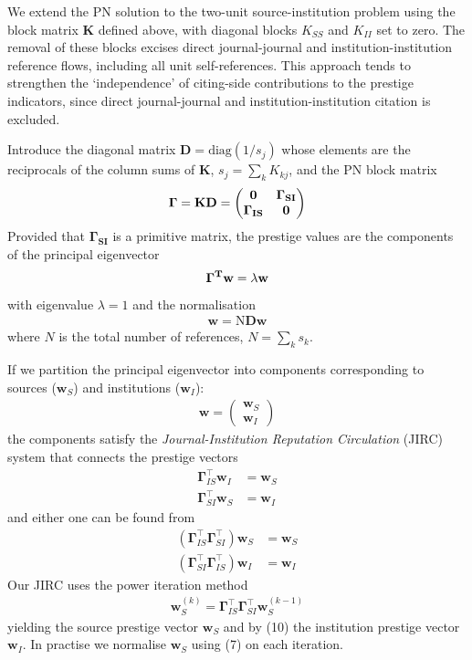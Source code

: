\documentclass[10pt]{article}
\begin{document}
We extend the PN solution to the two-unit source-institution problem using the block matrix $\mathbf{K}$ defined above, with diagonal blocks $K_{SS}$ and $K_{II}$ set to zero. The removal of these blocks excises direct journal-journal and institution-institution reference flows, including all unit self-references. This approach tends to strengthen the `independence' of citing-side contributions to the prestige indicators, since direct journal-journal and institution-institution citation is excluded. 

Introduce the diagonal matrix $\mathbf{D} = \text{diag}(1/s_j)$ whose elements are the reciprocals of the column sums of $\mathbf{K}$, $s_j = \sum_k K_{kj}$, and the PN block matrix 
\begin{align}
\bf{\Gamma} = \mathbf{K}\mathbf{D} = 
	\begin{pmatrix}
	\mathbf{0} & \bf{\Gamma}_{SI} \\
	\bf{\Gamma}_{IS} & \mathbf{0} 
\end{pmatrix}
\end{align}
Provided that $\mathbf{\Gamma_{SI}}$ is a primitive matrix, the prestige values are the components of the principal eigenvector
\begin{align}
\bf{\Gamma}^T \mathbf{w} = \lambda \mathbf{w}
\end{align}
with eigenvalue $\lambda = 1$ and the normalisation 
\begin{align}
\mathbf{w} = \text{N} \mathbf{D} \mathbf{w}  
\end{align}
where $N$ is the total number of references, $N = \sum_k s_k$.

If we partition the principal eigenvector into components corresponding to sources ($\mathbf{w}_S$) and institutions ($\mathbf{w}_I$):
\begin{align}
	\mathbf{w} = 
	\begin{pmatrix}
		\mathbf{w}_S \\
		\mathbf{w}_I
	\end{pmatrix}
\end{align}
the components satisfy the \textit{Journal-Institution Reputation Circulation} (JIRC) system that connects the prestige vectors 
\begin{align}
	\mathbf{\Gamma}_{IS}^\top \mathbf{w}_I &= \mathbf{w}_S \\
	\mathbf{\Gamma}_{SI}^\top \mathbf{w}_S &= \mathbf{w}_I
\end{align}
and either one can be found from
\begin{align}
	(\mathbf{\Gamma}_{IS}^\top \mathbf{\Gamma}_{SI}^\top) \mathbf{w}_S &= \mathbf{w}_S \\
	(\mathbf{\Gamma}_{SI}^\top \mathbf{\Gamma}_{IS}^\top) \mathbf{w}_I &= \mathbf{w}_I
\end{align}
Our JIRC uses the power iteration method
\begin{align}
\mathbf{w}_S^{(k)} = \mathbf{\Gamma}_{IS}^\top \mathbf{\Gamma}_{SI}^\top \mathbf{w}_S^{(k-1)}
\end{align}
yielding the source prestige vector $\mathbf{w}_S$ and by (10) the institution prestige vector $\mathbf{w}_I$. In practise we normalise $\mathbf{w}_S$ using (7) on each iteration.
\end{document}

